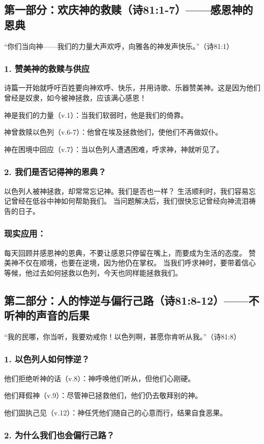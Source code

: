 \documentclass[a4paper, 12pt]{article}
\begin{document}
\subsection*{第一部分：欢庆神的救赎（诗81:1-7）——感恩神的恩典}
“你们当向神——我们的力量大声欢呼，向雅各的神发声快乐。”（诗81:1）
\subsubsection*{1. 赞美神的救赎与供应}
诗篇一开始就呼吁百姓要向神欢呼、快乐，并用诗歌、乐器赞美神。这是因为他们曾经是奴隶，如今被神拯救，应该满心感恩！

神是我们的力量（v.1）：当我们软弱时，他是我们的倚靠。

神曾救赎以色列（v.6-7）：他曾在埃及拯救他们，使他们不再做奴仆。

神在困境中回应（v.7）：当以色列人遭遇困难，呼求神，神就听见了。

\subsubsection*{2. 我们是否记得神的恩典？}
以色列人被神拯救，却常常忘记神。我们是否也一样？
生活顺利时，我们容易忘记曾经在低谷中神如何帮助我们。
当问题解决后，我们很快忘记曾经向神流泪祷告的日子。
\subsubsection*{现实应用：}
每天回顾并感恩神的恩典，不要让感恩只停留在嘴上，而要成为生活的态度。
赞美神不仅在顺境，也要在逆境，因为他仍在掌权。
当我们呼求神时，要带着信心等候，他过去如何拯救以色列，今天也同样能拯救我们。
\subsection*{第二部分：人的悖逆与偏行己路（诗81:8-12）——不听神的声音的后果}
“我的民哪，你当听，我要劝戒你！以色列啊，甚愿你肯听从我。”（诗81:8）
\subsubsection*{1. 以色列人如何悖逆？}

\hspace{0.6cm}他们拒绝听神的话（v.8）：神呼唤他们听从，但他们心刚硬。

他们拜假神（v.9）：尽管神已拯救他们，他们仍去敬拜别的神。

他们固执己见（v.12）：神任凭他们随自己的心意而行，结果自食恶果。
\subsubsection*{2. 为什么我们也会偏行己路？}
\end{document}
